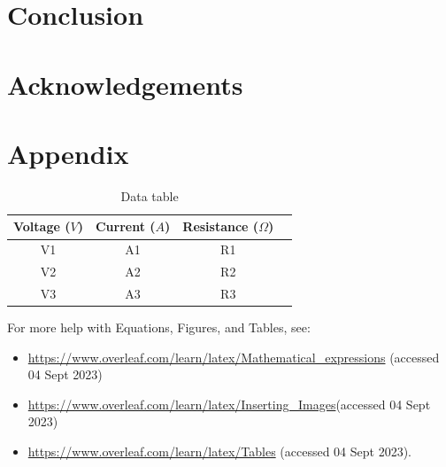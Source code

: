 \documentclass[12pt]{article}
\begin{document}
\section{Conclusion}

\section{Acknowledgements}

\printbibliography

\section*{Appendix}


\begin{table}[h!]
    \centering
    \begin{tabular}{ |c|c|c|c| } 
    \hline
    Voltage ($V$) & Current ($A$) & Resistance ($\Omega$) \\
    \hline
    V1 & A1 & R1 \\ 
    V2 & A2 & R2 \\ 
    V3 & A3 & R3 \\ 
    \hline
    \end{tabular}
    \caption{Data table}
    \label{Data table}
\end{table}

\noindent For more help with Equations, Figures, and Tables, see: 

\begin{itemize}
\item  \url{https://www.overleaf.com/learn/latex/Mathematical_expressions} (accessed 04 Sept 2023)
\item \url{https://www.overleaf.com/learn/latex/Inserting_Images}(accessed 04 Sept 2023) 
\item \url{https://www.overleaf.com/learn/latex/Tables} (accessed 04 Sept 2023).  
\end{itemize}
\end{document}

